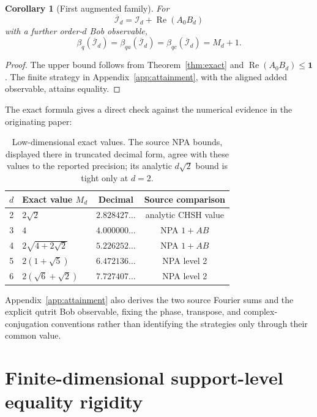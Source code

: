 \documentclass[11pt]{article}
\newtheorem{corollary}[theorem]{Corollary}
\theoremstyle{definition}
\theoremstyle{remark}
\newcommand{\Id}{\mathbf 1}
\newcommand{\cI}{\mathcal I}
\newcommand{\Reop}{\operatorname{Re}}
\begin{document}
\begin{corollary}[First augmented family]
\label{cor:first-augmented}
For
\[
 \overline{\cI}_d=\cI_d+\Reop(A_0B_d)
\]
with a further order-\(d\) Bob observable,
\[
 \beta_q(\overline{\cI}_d)
 =\beta_{qa}(\overline{\cI}_d)
 =\beta_{qc}(\overline{\cI}_d)=M_d+1.
\]
\end{corollary}

\begin{proof}
The upper bound follows from Theorem~\ref{thm:exact} and
\(\Reop(A_0B_d)\leq\Id\).  The finite strategy in
Appendix~\ref{app:attainment}, with the aligned added observable, attains
equality.
\end{proof}

The exact formula gives a direct check against the numerical evidence in the
originating paper:
\begin{table}[ht]
\centering
\small
\begin{tabularx}{0.94\textwidth}{@{}c>{\raggedright\arraybackslash}Xcc@{}}
\toprule
\(d\) & Exact value \(M_d\) & Decimal & Source comparison\\
\midrule
2 & \(2\sqrt2\) & \(2.828427\ldots\) & analytic CHSH value\\
3 & \(4\) & \(4.000000\ldots\) & NPA \(1+AB\)\\
4 & \(2\sqrt{4+2\sqrt2}\) & \(5.226252\ldots\) & NPA \(1+AB\)\\
5 & \(2(1+\sqrt5)\) & \(6.472136\ldots\) & NPA level 2\\
6 & \(2(\sqrt6+\sqrt2)\) & \(7.727407\ldots\) & NPA level 2\\
\bottomrule
\end{tabularx}
\caption{Low-dimensional exact values.  The source NPA bounds, displayed
there in truncated decimal form, agree with these values to the reported
precision; its analytic \(d\sqrt2\) bound is tight only at \(d=2\).}
\label{tab:exact-values}
\end{table}

Appendix~\ref{app:attainment} also derives the two source Fourier sums and
the explicit qutrit Bob observable, fixing the phase, transpose, and
complex-conjugation conventions rather than identifying the strategies only
through their common value.

\section{Finite-dimensional support-level equality rigidity}
\label{sec:rigidity}
\end{document}
